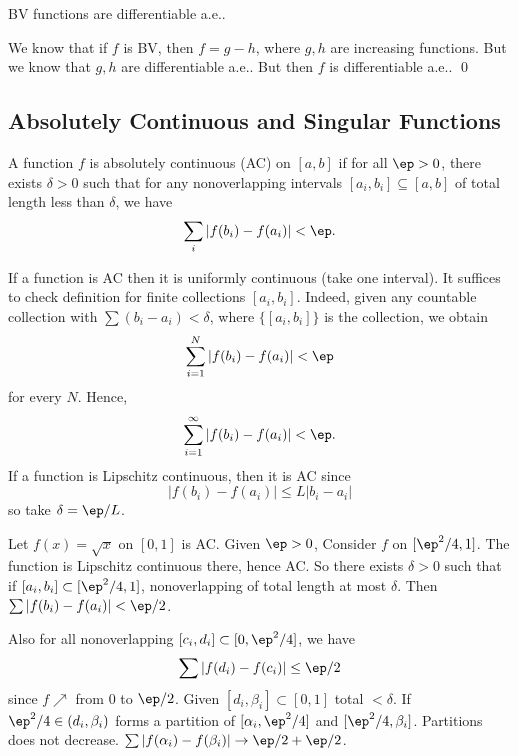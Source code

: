 




\begin{cor}
BV functions are differentiable a.e.. 
\end{cor}

\pf We know that if $f$ is BV, then $f= g-h$, where $g,h$ are increasing functions. But we know that $g,h$ are differentiable a.e.. But then $f$ is differentiable a.e.. \qed \\





\subsection{Absolutely Continuous and Singular Functions}



\begin{dfn}
A function $f$ is absolutely continuous (AC) on $[a,b]$ if for all $\ep>0$, there exists $\delta>0$ such that for any nonoverlapping intervals $[a_i,b_i] \subseteq [a,b]$ of total length less than $\delta$, we have
	\[
	\sum_i |f(b_i) - f(a_i)| < \ep.
	\]
\end{dfn}



If a function is AC then it is uniformly continuous (take one interval). It suffices to check definition for finite collections $[a_i,b_i]$. Indeed, given any countable collection with $\sum (b_i-a_i)<\delta$, where $\{[a_i,b_i]\}$ is the collection, we obtain
	\[
	\sum_{i=1}^N |f(b_i)-f(a_i)| < \ep
	\]
for every $N$. Hence,
	\[
	\sum_{i=1}^\infty |f(b_i) - f(a_i)| < \ep.
	\]
If a function is Lipschitz continuous, then it is AC since
	\[
	|f(b_i)-f(a_i)| \leq L |b_i-a_i|
	\]
so take $\delta= \ep/L$.



\begin{ex}
Let $f(x)= \sqrt{x}$ on $[0,1]$ is AC. Given $\ep>0$, Consider $f$ on $[\ep^2/4,1]$. The function is Lipschitz continuous there, hence AC. So there exists $\delta>0$ such that if $[a_i,b_i] \subset [\ep^2/4,1]$, nonoverlapping of total length at most $\delta$. Then $\sum |f(b_i) - f(a_i)| < \ep/2$. 

Also for all nonoverlapping $[c_i,d_i] \subset [0,\ep^2/4]$, we have
	\[
	\sum |f(d_i) - f(c_i)| \leq \ep/2
	\]
since $f \nearrow$ from 0 to $\ep/2$. Given $[d_i,\beta_i] \subset [0,1]$ total $<\delta$. If $\ep^2/4 \in (d_i,\beta_i)$ forms a partition of $[\alpha_i,\ep^2/4]$ and $[\ep^2/4,\beta_i]$. Partitions does not decrease. $\sum |f(\alpha_i)-f(\beta_i)| \to \ep/2+\ep/2$. 
\end{ex}


